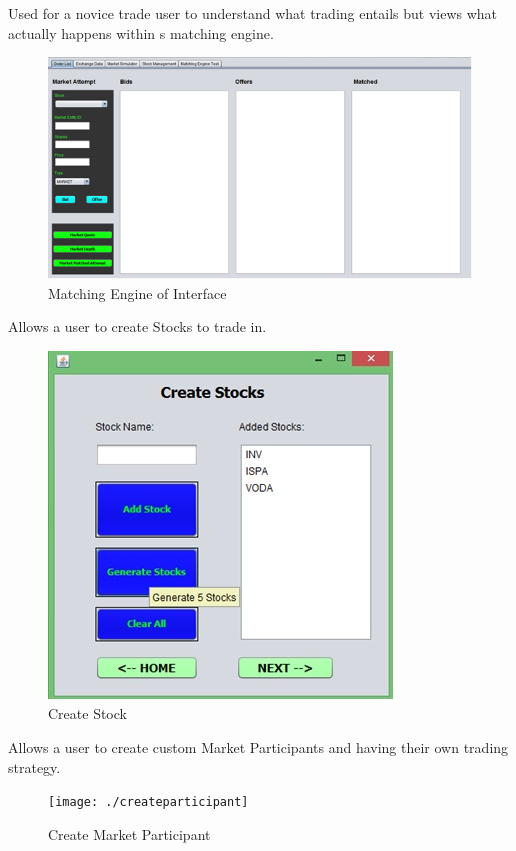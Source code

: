 \documentclass[12pt]{article}
\begin{document}
            Used for a novice trade user to understand what trading entails but views what actually happens within s matching engine.
          
            \begin{figure}[th]
            \centering
            \includegraphics[scale=0.8]{./matchingengine}
            \caption{Matching Engine of Interface}
            \label{Matching Engine}
            \end{figure}
            
             Allows a user to create Stocks to trade in.

        \pagebreak
\begin{figure}[h!]
\centering
\includegraphics[scale=0.8]{./createstock}
\caption{Create Stock}
\label{Create Stock}
\end{figure}

    Allows a user to create custom Market Participants and having their own trading strategy.

            
\begin{figure}[h!]
\centering
\texttt{[image: ./createparticipant]}
\caption{Create Market Participant}
\label{Create Market Participant}
\end{figure}
\end{document}
